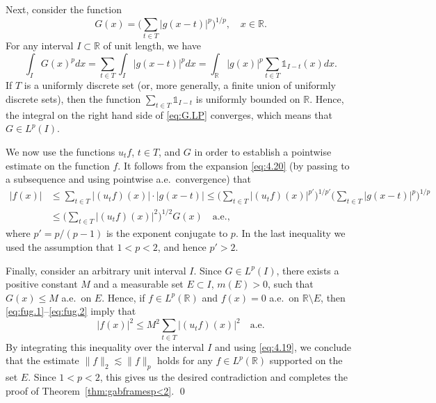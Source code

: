\documentclass[reqno,a4paper,12pt]{amsart}
\numberwithin{equation}{section}
\numberwithin{figure}{section}
\newcommand\R{\mathbb{R}}
\newcommand\1{\mathds{1}}
\newcommand{\TTT}{T}
\renewcommand\le{\leqslant}
\theoremstyle{plain}
\newcommand{\thmref}[1]{Theorem~\ref{#1}}
\theoremstyle{definition}
\begin{document}
Next, consider the function
\begin{equation}
G(x)=  \Big(\sum_{t\in \TTT}|g(x-t)|^p\Big)^{1/p}, \quad x \in \R.
\end{equation}
For any interval $I\subset\R$ of unit length, we have
\begin{equation}
\label{eq:G.LP}
\int_I G(x)^p dx = \sum_{t\in \TTT} \int_I|g(x-t)|^p dx = \int_{\R}|g(x)|^p  \sum_{t\in \TTT} \1_{I-t}(x)  dx.
\end{equation}
If $\TTT$ is a uniformly discrete set (or, more generally, a finite union of uniformly discrete sets), then the function  $\sum_{t\in \TTT} \1_{I-t}$ is uniformly bounded on $\R$. Hence, the integral on the right hand side of \eqref{eq:G.LP} converges, which means that $G\in L^p(I)$. 

We now use the functions $u_t f$, $t \in \TTT$, and $G$ in order to establish a pointwise estimate on the function $f$. It follows from the expansion \eqref{eq:4.20} (by passing to a subsequence and using pointwise a.e.\ convergence) that
\begin{align}
|f(x)| &\le \sum_{t\in \TTT} |(u_{t}f)(x)| \cdot |g(x-t)|  \le \Big(\sum_{t\in \TTT} |(u_{t} f)(x)|^{p'}\Big)^{1/p'}\Big( \sum_{t\in \TTT} |g(x-t)|^p \Big)^{1/p}
\label{eq:fug.1} \\
& \le \Big( \sum_{t\in \TTT} |(u_{t}f)(x)|^2 \Big)^{1/2}  G(x) \quad \text{a.e.,}
\label{eq:fug.2}
\end{align}
where $p'= p / (p-1) $ is the exponent conjugate to $p$. In the last inequality we used the assumption that $1<p<2$, and hence $p' > 2$.

Finally, consider an arbitrary unit interval $I$. Since $G\in L^p(I)$, there exists a positive constant $M$ and a measurable set $E \subset I$, $m(E)>0$, such that $G(x)\le M$ a.e.\ on $E$. Hence, if $f\in L^p(\R)$ and $f(x) =0$ a.e.\ on  $\R\setminus E$, then \eqref{eq:fug.1}--\eqref{eq:fug.2} imply that
\begin{equation}
|f(x)|^2\le M^2  \sum_{t\in \TTT} |(u_{t} f)(x)|^2  \quad \text{a.e.}
\end{equation}
By integrating this inequality over the interval $I$ and using \eqref{eq:4.19}, we conclude that the estimate $\|f\|_2\lesssim \|f\|_p$ holds for any $f\in L^p(\R)$ supported on the set $E$. Since $1 < p < 2$, this gives us the desired contradiction and completes the proof of \thmref{thm:gabframesp<2}.
\qed


\end{document}
